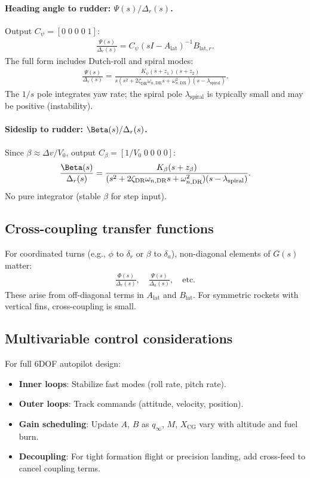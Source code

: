 \documentclass[11pt]{article}
\begin{document}
\paragraph{Heading angle to rudder: $\Psi(s)/\Delta_r(s)$.}
Output $C_\psi=[0\;0\;0\;0\;1]$:
\begin{align}
\frac{\Psi(s)}{\Delta_r(s)} = C_\psi(sI-A_{\text{lat}})^{-1}B_{\text{lat},r}.
\end{align}
The full form includes Dutch-roll and spiral modes:
\begin{align}
\frac{\Psi(s)}{\Delta_r(s)} = \frac{K_\psi(s+z_1)(s+z_2)}{s(s^2+2\zeta_{\text{DR}}\omega_{n,\text{DR}}s+\omega_{n,\text{DR}}^2)(s-\lambda_{\text{spiral}})}.
\end{align}
The $1/s$ pole integrates yaw rate; the spiral pole $\lambda_{\text{spiral}}$ is typically small and may be positive (instability).

\paragraph{Sideslip to rudder: $\Beta(s)/\Delta_r(s)$.}
Since $\beta\approx\Delta v/V_0$, output $C_\beta=[1/V_0\;0\;0\;0\;0]$:
\begin{align}
\frac{\Beta(s)}{\Delta_r(s)} = \frac{K_\beta(s+z_\beta)}{(s^2+2\zeta_{\text{DR}}\omega_{n,\text{DR}}s+\omega_{n,\text{DR}}^2)(s-\lambda_{\text{spiral}})}.
\end{align}
No pure integrator (stable $\beta$ for step input).

\subsection{Cross-coupling transfer functions}
For coordinated turns (e.g., $\phi$ to $\delta_r$ or $\beta$ to $\delta_a$), non-diagonal elements of $G(s)$ matter:
\begin{align}
\frac{\Phi(s)}{\Delta_r(s)}, \quad \frac{\Psi(s)}{\Delta_a(s)}, \quad \text{etc.}
\end{align}
These arise from off-diagonal terms in $A_{\text{lat}}$ and $B_{\text{lat}}$. For symmetric rockets with vertical fins, cross-coupling is small.

\subsection{Multivariable control considerations}
For full 6DOF autopilot design:
\begin{itemize}[leftmargin=2em]
\item \textbf{Inner loops}: Stabilize fast modes (roll rate, pitch rate).
\item \textbf{Outer loops}: Track commands (attitude, velocity, position).
\item \textbf{Gain scheduling}: Update $A$, $B$ as $q_\infty$, $M$, $X_{\text{CG}}$ vary with altitude and fuel burn.
\item \textbf{Decoupling}: For tight formation flight or precision landing, add cross-feed to cancel coupling terms.
\end{itemize}
\end{document}

